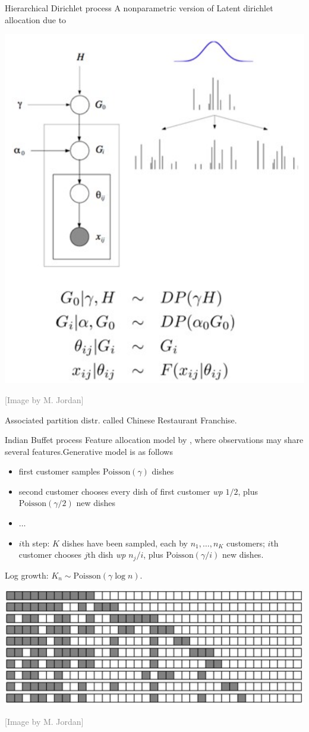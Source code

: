 \begin{frame}{Hierarchical Dirichlet process}
A nonparametric version of \alert{Latent dirichlet allocation} \citep{blei2003latent} due to  \citet{teh2006hierarchical}\\
\begin{center}
		\includegraphics[width=.5\textwidth]{figures_julyan/beyond_DP/HDP}
\end{center}
\hfill\textcolor{gray}{[Image by M. Jordan]}
\pause
	
	Associated partition distr. called \alert{Chinese Restaurant Franchise}.
\end{frame}

\begin{frame}{Indian Buffet process}
	Feature allocation model by  \citet{ghahramani2006infinite}, where observations may share several features.\pause 	\alert{Generative model is as follows}
	\begin{itemize}[<+->]
		\item first customer samples $\text{Poisson}(\gamma)$ dishes
		\item second customer chooses every dish of first customer \textit{wp} $1/2$, plus  $\text{Poisson}(\gamma/2)$ new dishes
		\item $\ldots$
		\item $i$th step: $K$ dishes have been sampled, each by $n_1,\ldots,n_K$ customers;  $i$th customer chooses $j$th dish  \textit{wp} $n_j/i$, plus  $\text{Poisson}(\gamma/i)$ new dishes.
	\end{itemize}\pause
	
	\alert{Log growth}: $K_n\sim \text{Poisson}(\gamma\log n)$.
	
		\begin{center}
			\includegraphics[width=.7\textwidth]{figures_julyan/beyond_DP/IBP_draw}
		\end{center}
		\hfill\textcolor{gray}{[Image by M. Jordan]}
\end{frame}

